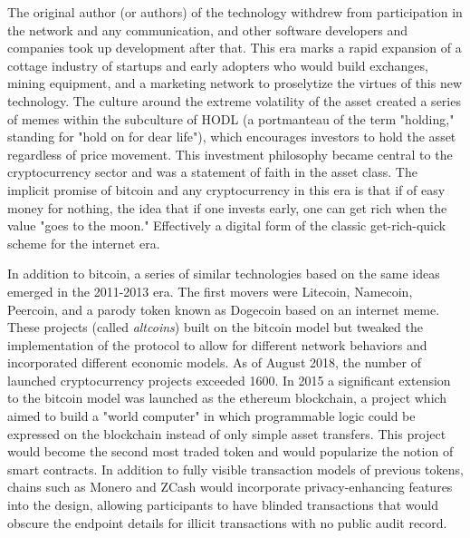 The original author (or authors) of the technology withdrew from participation
in the network and any communication, and other software developers and
companies took up development after that. This era marks a rapid expansion of a
cottage industry of startups and early adopters who would build exchanges,
mining equipment, and a marketing network to proselytize the virtues of this new
technology. The culture around the extreme volatility of the asset created a
series of memes within the subculture of HODL (a portmanteau of the term
"holding," standing for "hold on for dear life"), which encourages investors to
hold the asset regardless of price movement. This investment philosophy became
central to the cryptocurrency sector and was a statement of faith in the asset
class. The implicit promise of bitcoin and any cryptocurrency in this era is
that if of easy money for nothing, the idea that if one invests early, one can
get rich when the value "goes to the moon." Effectively a digital form of the
classic get-rich-quick scheme for the internet era.


In addition to bitcoin, a series of similar technologies based on the same ideas
emerged in the 2011-2013 era. The first movers were Litecoin, Namecoin,
Peercoin, and a parody token known as Dogecoin based on an internet meme. These
projects (called \textit{altcoins}) built on the bitcoin model but tweaked the
implementation of the protocol to allow for different network behaviors and
incorporated different economic models. As of August 2018, the number of
launched cryptocurrency projects exceeded 1600. In 2015 a significant extension
to the bitcoin model was launched as the ethereum blockchain, a project which
aimed to build a "world computer" in which programmable logic could be expressed
on the blockchain instead of only simple asset transfers. This project would
become the second most traded token and would popularize the notion of smart
contracts. In addition to fully visible transaction models of previous tokens,
chains such as Monero and ZCash would incorporate privacy-enhancing features
into the design, allowing participants to have blinded transactions that would
obscure the endpoint details for illicit transactions with no public audit
record.


